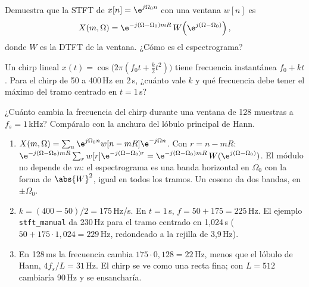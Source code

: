 \documentclass[11pt,a4paper]{scrartcl}
\begin{document}
\begin{ejercicio}
  \begin{incisos}[1]
    \item Demuestra que la STFT de $x[n]=\e^{j\Omega_0n}$ con una ventana $w[n]$ es
    \[
      X(m,\Omega)=\e^{-j(\Omega-\Omega_0)mR}\,W\!\left(\e^{j(\Omega-\Omega_0)}\right),
    \]
    donde $W$ es la DTFT de la ventana. ¿Cómo es el espectrograma?
    \item Un chirp lineal $x(t)=\cos\!\big(2\pi(f_0t+\frac k2t^2)\big)$ tiene frecuencia instantánea $f_0+kt$. Para el chirp de 50 a 400\,Hz en 2\,s, ¿cuánto vale $k$ y qué frecuencia debe tener el máximo del tramo centrado en $t=1$\,s?
    \item ¿Cuánto cambia la frecuencia del chirp durante una ventana de 128 muestras a $f_s=1$\,kHz? Compáralo con la anchura del lóbulo principal de Hann.
  \end{incisos}
\end{ejercicio}
\begin{solucion}
  \begin{enumerate}[label=\alph*)]
    \item $X(m,\Omega)=\sum_n\e^{j\Omega_0n}w[n-mR]\e^{-j\Omega n}$. Con $r=n-mR$: $\e^{-j(\Omega-\Omega_0)mR}\sum_rw[r]\e^{-j(\Omega-\Omega_0)r}=\e^{-j(\Omega-\Omega_0)mR}\,W(\e^{j(\Omega-\Omega_0)})$. El módulo no depende de $m$: el espectrograma es una banda horizontal en $\Omega_0$ con la forma de $\abs{W}^2$, igual en todos los tramos. Un coseno da dos bandas, en $\pm\Omega_0$.
    \item $k=(400-50)/2=175$\,Hz/s. En $t=1$\,s, $f=50+175=225$\,Hz. El ejemplo \texttt{stft\_manual} da 230\,Hz para el tramo centrado en 1,024\,s ($50+175\cdot1{,}024=229$\,Hz, redondeado a la rejilla de 3,9\,Hz).
    \item En 128\,ms la frecuencia cambia $175\cdot0{,}128=22$\,Hz, menos que el lóbulo de Hann, $4f_s/L=31$\,Hz. El chirp se ve como una recta fina; con $L=512$ cambiaría 90\,Hz y se ensancharía.
  \end{enumerate}
\end{solucion}
\end{document}
